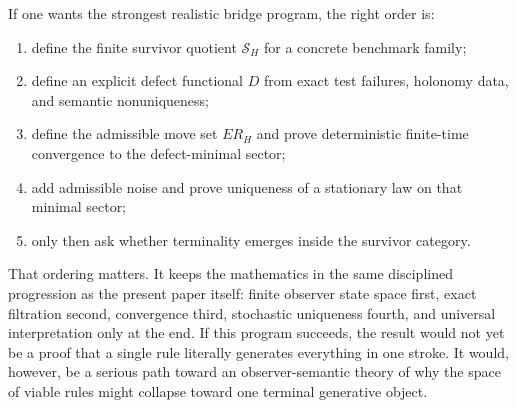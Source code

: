 \documentclass[11pt]{article}
\theoremstyle{remark}
\theoremstyle{plain}
\begin{document}
If one wants the strongest realistic bridge program, the right order is:
\begin{enumerate}[leftmargin=2em]
\item define the finite survivor quotient \(\mathcal S_H\) for a concrete benchmark family;
\item define an explicit defect functional \(D\) from exact test failures, holonomy data, and semantic nonuniqueness;
\item define the admissible move set \(ER_H\) and prove deterministic finite-time convergence to the defect-minimal sector;
\item add admissible noise and prove uniqueness of a stationary law on that minimal sector;
\item only then ask whether terminality emerges inside the survivor category.
\end{enumerate}

That ordering matters. It keeps the mathematics in the same disciplined progression as the present paper itself: finite observer state space first, exact filtration second, convergence third, stochastic uniqueness fourth, and universal interpretation only at the end. If this program succeeds, the result would not yet be a proof that a single rule literally generates everything in one stroke. It would, however, be a serious path toward an observer-semantic theory of why the space of viable rules might collapse toward one terminal generative object.
\end{document}
